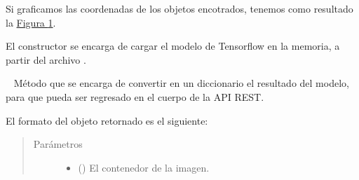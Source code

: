 \begin{fulllineitems}
\begin{fulllineitems}
Si graficamos las coordenadas de los objetos encotrados, tenemos como resultado
la \hyperref[\detokenize{chapter_two/desc_cloudnao:obj-detec-after}]{Figura \ref{\detokenize{chapter_two/desc_cloudnao:obj-detec-after}}}.

\begin{figure}[htbp]
\centering

\noindent{}
\label{\detokenize{chapter_two/desc_cloudnao:obj-detec-after}}\end{figure}

El constructor se encarga de cargar el modelo de Tensorflow en la
memoria, a partir del archivo .

\begin{fulllineitems}
\label{\detokenize{chapter_two/desc_cloudnao:app.tf_models.object_detection.ObjectDetectionTensorflow.create_response}}~
Método que se encarga de convertir en un diccionario el resultado del
modelo, para que pueda ser regresado en el cuerpo de la API REST.

El formato del objeto retornado es el siguiente:

\begin{sphinxVerbatim}[commandchars=\\\{\}]
\PYG{p}{[}
          
         
         
          
          
          
\PYG{p}{]}
\end{sphinxVerbatim}
\begin{quote}\begin{description}
\item[{Parámetros}] \leavevmode\begin{itemize}
\item {} 
 () \textendash{} El contenedor de la imagen.


\end{itemize}
\end{description}
\end{quote}
\end{fulllineitems}
\end{fulllineitems}
\end{fulllineitems}
